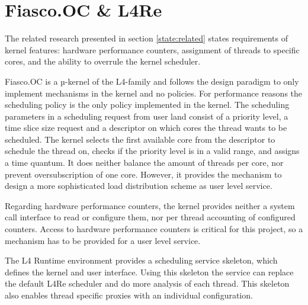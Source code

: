 \section{Fiasco.OC \& L4Re}
\label{state:env}
The related research presented in section \ref{state:related} states
requirements of kernel features:
hardware performance counters, assignment of threads to specific
cores, and the ability to overrule the kernel scheduler.

Fiasco.OC is a µ-kernel of the L4-family and follows the design paradigm to
only implement mechanisms in the kernel and no policies.
For performance reasons the scheduling policy is the only policy implemented in
the kernel.
The scheduling parameters in a scheduling request from user land consist of
a priority level, a time slice size request and a descriptor on which cores the
thread wants to be scheduled.
The kernel selects the first available core from the descriptor to schedule the
thread on, checks if the priority level is in a valid range, and assigns a time
quantum.
It does neither balance the amount of threads per core, nor prevent
oversubscription of one core.
However, it provides the mechanism to design a more sophisticated load
distribution scheme as user level service.

Regarding hardware performance counters, the kernel provides neither a system
call interface to read or configure them, nor per thread accounting of
configured counters.
Access to hardware performance counters is critical for this project, so a
mechanism has to be provided for a user level service.

The L4 Runtime environment provides a scheduling service skeleton, which
defines the kernel and user interface.
Using this skeleton the service can replace the default L4Re scheduler and do
more analysis of each thread.
This skeleton also enables thread specific proxies with an individual
configuration.


